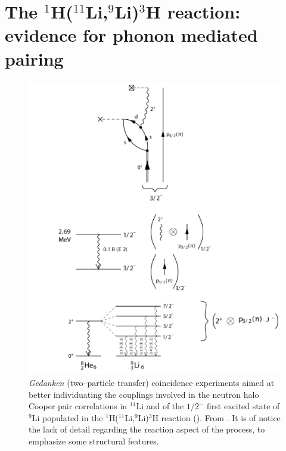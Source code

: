 \section[Evidence for phonon mediated pairing]{The $^1$H($^{11}$Li,$^9$Li)$^3$H reaction: evidence for phonon mediated pairing}\label{C8S1}
    \begin{figure}
    \centerline{\includegraphics*[width=16cm,angle=0]{C8/figsC8/fig8_1_3x}}
    	\caption{\emph{Gedanken} (two--particle transfer) coincidence experiments aimed at better individuating the couplings involved in the neutron halo Cooper pair correlations in $^{11}$Li and of the $1/2^-$ first excited state of $^9$Li populated in the  
    	 $^1$H($^{11}$Li,$^9$Li)$^3$H  reaction (\cite{Tanihata:08,Barranco:01,Potel:10}). From \cite{Potel:14}. It is of notice the lack of detail regarding the reaction aspect of the process, to emphasize some structural features.}\label{fig8_1_3}
    \end{figure}

